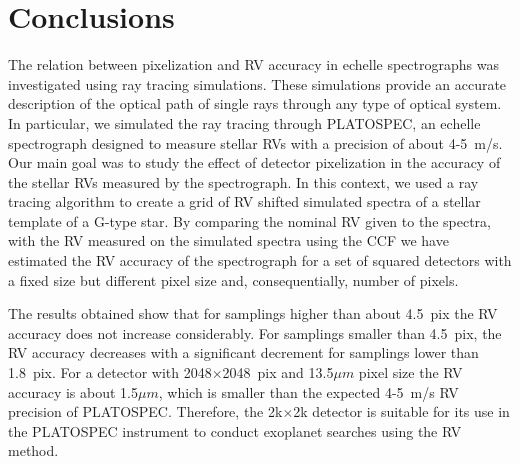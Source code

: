 \documentclass{article}
\begin{document}
\section{Conclusions}
The relation between pixelization and RV accuracy in echelle spectrographs was investigated using ray tracing simulations. These simulations provide an accurate description of the optical path of single rays through any type of optical system. In particular, we simulated the ray tracing through PLATOSPEC, an echelle spectrograph designed to measure stellar RVs with a precision of about 4-5~m/s. 
Our main goal was to study the effect of detector pixelization in the accuracy of the stellar RVs measured by the spectrograph. In this context, we used a ray tracing algorithm to create a grid of RV shifted simulated spectra of a stellar template of a G-type star. By comparing the nominal RV given to the spectra, with the RV measured on the simulated spectra using the CCF we have estimated the RV accuracy of the spectrograph for a set of squared detectors with a fixed size but different pixel size and, consequentially, number of pixels. 

The results obtained show that for samplings higher than about 4.5~pix the RV accuracy does not increase considerably. For samplings smaller than 4.5~pix, the RV accuracy decreases with a significant decrement for samplings lower than 1.8~pix. For a detector with 2048$\times$2048~pix and 13.5$\mu m$ pixel size the RV accuracy is about 1.5$\mu m$, which is smaller than the expected 4-5~m/s RV precision of PLATOSPEC. Therefore, the 2k$\times$2k detector is suitable for its use in the PLATOSPEC instrument to conduct exoplanet searches using the RV method.

\printbibliography
\end{document}
